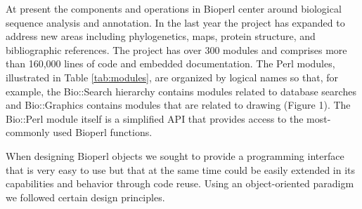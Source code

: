 \documentclass[12pt]{article}
\begin{document}
At present the components and operations in Bioperl center around
biological sequence analysis and annotation.  In the last year the
project has expanded to address new areas including phylogenetics,
maps, protein structure, and bibliographic references.  The project
has over 300 modules and comprises more than 160,000 lines of code and
embedded documentation.  The Perl modules, illustrated in Table
\ref{tab:modules}, are organized by logical names so that, for example,
the Bio::Search hierarchy contains modules related to database
searches and Bio::Graphics contains modules that are related to
drawing (Figure 1).  The Bio::Perl module itself
is a simplified API that provides access to the most-commonly used 
Bioperl functions.

When designing Bioperl objects we sought to provide a
programming interface that is very easy to use but that at the same
time could be easily extended in its capabilities and behavior through
code reuse.  Using an object-oriented paradigm we followed certain
design principles.
\end{document}
